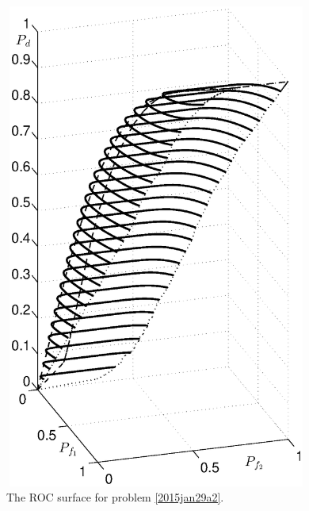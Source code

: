 \begin{figure}[!t]
\centering
\includegraphics[width = 10cm, height=16cm]{2/ex2.eps}
\caption{The ROC surface for problem \eqref{2015jan29a2}.}
\label{fig: 2.2mar9}
\end{figure}


